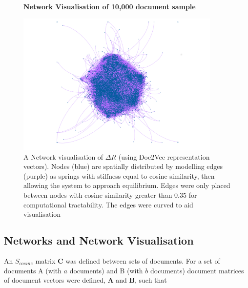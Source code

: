 \begin{center}
\begin{figure}[H]
  \centering
  \textbf{Network Visualisation of 10,000 document sample}\par\medskip
     \includegraphics[width=0.9\textwidth]{Validation/sample.png}
    \caption[Network Visualisation of 10,000 document random sample]{A Network visualisation of $\Delta R$ (using Doc2Vec representation vectors). Nodes (blue) are spatially distributed by modelling edges (purple) as springs  with stiffness equal to cosine similarity, then allowing the system to approach equilibrium. Edges were only placed between nodes with cosine similarity greater than 0.35 for computational tractability. The edges were curved to aid visualisation}
    \label{fig:gephi_exp}
\end{figure} 
\end{center}
\newpage
\subsection{Networks and Network Visualisation}
\label{sec:COSINEMAT}
An $S_{cosine}$ matrix $\mathbf{C}$ was defined between sets of documents. For a set of documents  A (with $a$ documents) and B (with $b$ documents) document matrices of document vectors were defined, $\mathbf{A}$ and $\mathbf{B}$, such that 

